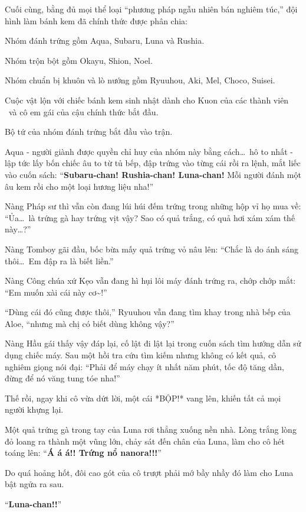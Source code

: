 \documentclass[../main.tex]{subfiles}
\begin{document}
Cuối cùng, bằng đủ mọi thể loại ``phương pháp ngẫu nhiên bán nghiêm túc,'' đội hình làm bánh kem đã chính thức được phân chia:

Nhóm đánh trứng gồm Aqua, Subaru, Luna và Rushia.

Nhóm trộn bột gồm Okayu, Shion, Noel.

Nhóm chuẩn bị khuôn và lò nướng gồm Ryuuhou, Aki, Mel, Choco, Suisei.

Cuộc vật lộn với chiếc bánh kem sinh nhật dành cho Kuon của các thành viên \hll\ và cô em gái của cậu chính thức bắt đầu.

\ct

Bộ tứ của nhóm đánh trứng bắt đầu vào trận.

Aqua - người giành được quyền chỉ huy của nhóm này bằng cách\dots\ hô to nhất - lập tức lấy bốn chiếc âu to từ tủ bếp, đập trứng vào từng cái rồi ra lệnh, mắt liếc vào cuốn sách: ``\textbf{Subaru-chan! Rushia-chan! Luna-chan!} Mỗi người đánh một âu kem rồi cho một loại hương liệu nha!''

Nàng Pháp sư thì vẫn còn đang lúi húi đếm trứng trong những hộp vỉ họ mua về: ``Ủa\dots\ là trứng gà hay trứng vịt vậy? Sao có quả trắng, có quả hơi xám xám thế này\dots?''

Nàng Tomboy gãi đầu, bốc bừa mấy quả trứng vỏ nâu lên: ``Chắc là do ánh sáng thôi\dots\ Em đập ra là biết liền.''

Nàng Công chúa xứ Kẹo vẫn đang hì hụi lôi máy đánh trứng ra, chớp chớp mắt: ``Em muốn xài cái này cơ\~{}!''

``Dùng cái đó cũng được thôi,'' Ryuuhou vẫn đang tìm khay trong nhà bếp của Aloe, ``nhưng mà chị có biết dùng không vậy?''

Nàng Hầu gái thấy vậy đáp lại, cố lật đi lật lại trong cuốn sách tìm hướng dẫn sử dụng chiếc máy. Sau một hồi tra cứu tìm kiếm nhưng không có kết quả, cô nghiêm giọng nói đại: ``Phải để máy chạy ít nhất năm phút, tốc độ tăng dần, đừng để nó văng tung tóe nha!''

Thế rồi, ngay khi cô vừa dứt lời, một cái *BỘP!* vang lên, khiến tất cả mọi người khựng lại.

Một quả trứng gà trong tay của Luna rơi thẳng xuống nền nhà. Lòng trắng lòng đỏ loang ra thành một vũng lớn, chảy sát đến chân của Luna, làm cho cô hét toáng lên: ``\textbf{Á á á!! Trứng nổ nanora!!!}''

Do quá hoảng hốt, đôi cao gót của cô trượt phải mớ bầy nhầy đó làm cho Luna bật ngửa ra sau.

``\textbf{Luna-chan!!}''
\end{document}
